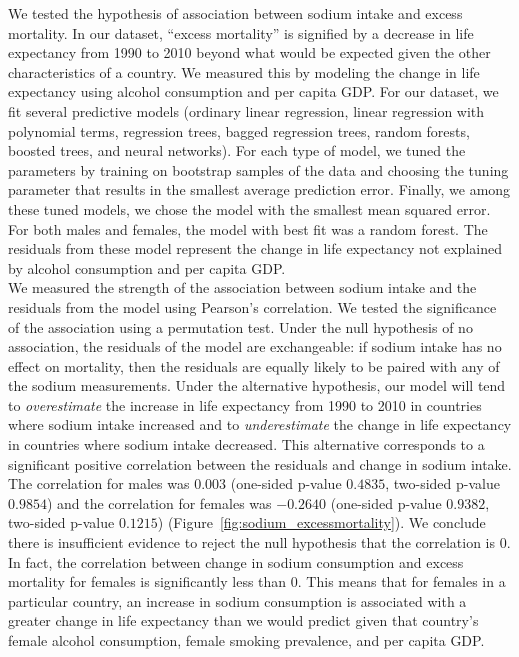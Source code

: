 \documentclass{article}
\begin{document}
We tested the hypothesis of association between sodium intake and excess mortality.  In our dataset, ``excess mortality'' is signified by a decrease in life expectancy from 1990 to 2010 beyond what would be expected given the other characteristics of a country.  We measured this by modeling the change in life expectancy using alcohol consumption and per capita GDP.  For our dataset, we fit several predictive models (ordinary linear regression, linear regression with polynomial terms, regression trees, bagged regression trees, random forests, boosted trees, and neural networks).  For each type of model, we tuned the parameters by training on bootstrap samples of the data and choosing the tuning parameter that results in the smallest average prediction error.  Finally, we among these tuned models, we chose the model with the smallest mean squared error.  For both males and females, the model with best fit was a random forest.  The residuals from these model represent the change in life expectancy not explained by alcohol consumption and per capita GDP. \\

We measured the strength of the association between sodium intake and the residuals from the model using Pearson's correlation. We tested the significance of the association using a permutation test.  Under the null hypothesis of no association, the residuals of the model are exchangeable: if sodium intake has no effect on mortality, then the residuals are equally likely to be paired with any of the sodium measurements.  Under the alternative hypothesis, our model will tend to \textit{overestimate} the increase in life expectancy from 1990 to 2010 in countries where sodium intake increased and to \textit{underestimate} the change in life expectancy in countries where sodium intake decreased. This alternative corresponds to a significant positive correlation between the residuals and change in sodium intake.  The correlation for males was $0.003$ (one-sided p-value $0.4835$, two-sided p-value $0.9854$) and the correlation for females was $-0.2640$ (one-sided p-value $0.9382$, two-sided p-value $0.1215$) (Figure~\ref{fig:sodium_excessmortality}). We conclude there is insufficient evidence to reject the null hypothesis that the correlation is $0$.  In fact, the correlation between change in sodium consumption and excess mortality for females is significantly less than $0$.  This means that for females in a particular country, an increase in sodium consumption is associated with a greater change in life expectancy than we would predict given that country's female alcohol consumption, female smoking prevalence, and per capita GDP. \\
\end{document}
